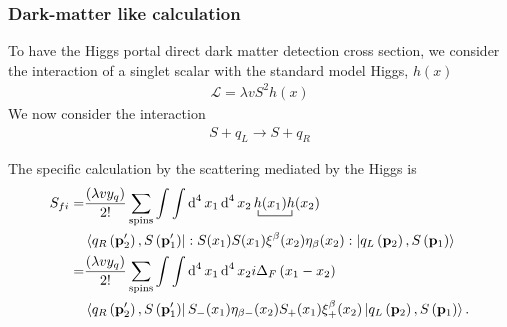\subsubsection{Dark-matter like calculation}

To have the Higgs portal direct dark matter detection cross section, we consider the interaction of a singlet scalar with the standard model Higgs, $h(x)$
\begin{align}
 \mathcal{L}=\lambda v S^2 h(x) 
\end{align}
We now consider the interaction
\begin{align}
  S+q_L \to S+q_R
\end{align}

The specific calculation by the scattering mediated by the Higgs is 
\begin{align}
  S_{fi}=&\frac{\left(\lambda  v y_q \right)}{2!}\sum_{\text{spins}}\int\int \operatorname{d}^4x_1 \operatorname{d}^4x_2
\bcontraction{\,}{h}{(x_1)}{h}\,h(x_1)h(x_2) \nonumber\\
&\left\langle q_R \left(\mathbf{p}'_2\right),S\left(\mathbf{p}'_1\right) \right|
  : S(x_1)S(x_1)
    \xi^{\beta}(x_2)\eta_{\beta}(x_2):
 \left| q_L\left(\mathbf{p}_2\right) ,S \left(\mathbf{p}_1\right)  \right\rangle \nonumber\\
=&\frac{\left( \lambda  v y_q \right)}{2!}\sum_{\text{spins}}\int\int \operatorname{d}^4x_1 \operatorname{d}^4x_2
i\Delta_F \left( x_1-x_2 \right)\nonumber\\
&\left\langle q_R \left(\mathbf{p}'_2\right),S\left(\mathbf{p}'_1\right)\right|
   S_-(x_1)\eta_{\beta-}(x_2) S_+(x_1)\xi^{\beta}_{+}(x_2)
 \left| q_L\left(\mathbf{p}_2\right), S \left(\mathbf{p}_1\right)\right\rangle. 
\end{align}




